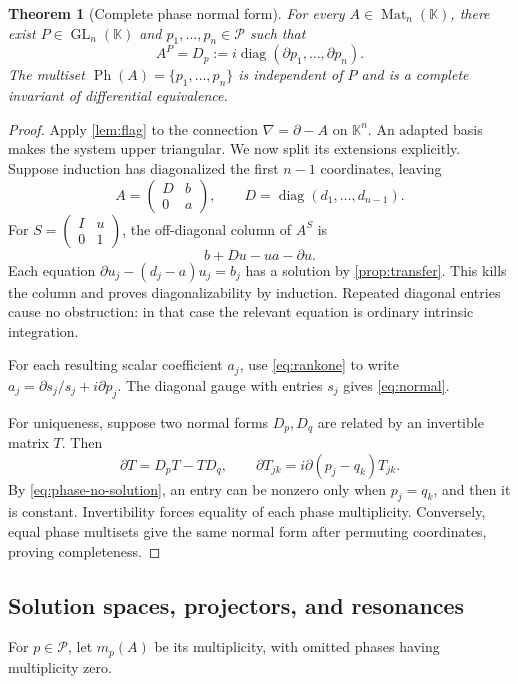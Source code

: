 \documentclass[11pt,a4paper]{article}
\numberwithin{equation}{section}
\newtheorem{theorem}{Theorem}[section]
\theoremstyle{definition}
\theoremstyle{remark}
\newcommand{\K}{\mathbb K}
\newcommand{\PP}{\mathcal P}
\newcommand{\diag}{\operatorname{diag}}
\newcommand{\GL}{\operatorname{GL}}
\newcommand{\Specph}{\operatorname{Ph}}
\newcommand{\Mat}{\operatorname{Mat}}
\begin{document}
\begin{theorem}[Complete phase normal form]\label{thm:normal}
For every $A\in\Mat_n(\K)$, there exist $P\in\GL_n(\K)$ and
$p_1,\ldots,p_n\in\PP$ such that
\begin{equation}\label{eq:normal}
 A^P=D_p:=i\diag(\partial p_1,\ldots,\partial p_n).
\end{equation}
The multiset $\Specph(A)=\{p_1,\ldots,p_n\}$ is independent of $P$ and is
a complete invariant of differential equivalence.
\end{theorem}
\begin{proof}
Apply \cref{lem:flag} to the connection $\nabla=\partial-A$ on $\K^n$.
An adapted basis makes the system upper triangular. We now split its
extensions explicitly. Suppose induction has diagonalized the first
$n-1$ coordinates, leaving
\[
 A=\begin{pmatrix}D&b\\0&a\end{pmatrix},\qquad
 D=\diag(d_1,\ldots,d_{n-1}).
\]
For $S=\left(\begin{smallmatrix}I&u\\0&1\end{smallmatrix}\right)$,
the off-diagonal column of $A^S$ is
\[
 b+Du-ua-\partial u.
\]
Each equation $\partial u_j-(d_j-a)u_j=b_j$ has a solution by
\cref{prop:transfer}. This kills the column and proves diagonalizability
by induction. Repeated diagonal entries cause no obstruction: in that case
the relevant equation is ordinary intrinsic integration.

For each resulting scalar coefficient $a_j$, use \eqref{eq:rankone} to
write $a_j=\partial s_j/s_j+i\partial p_j$. The diagonal gauge with entries
$s_j$ gives \eqref{eq:normal}.

For uniqueness, suppose two normal forms $D_p,D_q$ are related by an
invertible matrix $T$. Then
\begin{equation}\label{eq:intertwiner}
 \partial T=D_pT-TD_q,
 \qquad
 \partial T_{jk}=i\partial(p_j-q_k)T_{jk}.
\end{equation}
By \eqref{eq:phase-no-solution}, an entry can be nonzero only when
$p_j=q_k$, and then it is constant. Invertibility forces equality of each
phase multiplicity. Conversely, equal phase multisets give the same normal
form after permuting coordinates, proving completeness.
\end{proof}

\subsection{Solution spaces, projectors, and resonances}
For $p\in\PP$, let $m_p(A)$ be its multiplicity, with omitted phases having
multiplicity zero.
\end{document}
